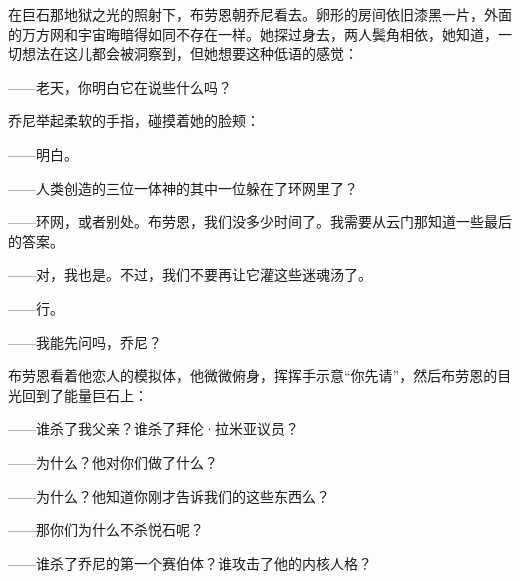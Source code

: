 \documentclass[AutoFakeBold=true]{book}
\begin{document}
\vspace*{1em}

在巨石那地狱之光的照射下，布劳恩朝乔尼看去。卵形的房间依旧漆黑一片，外面的万方网和宇宙晦暗得如同不存在一样。她探过身去，两人鬓角相依，她知道，一切想法在这儿都会被洞察到，但她想要这种低语的感觉：

{\kaishu ——老天，你明白它在说些什么吗？}

乔尼举起柔软的手指，碰摸着她的脸颊：

{\kaishu ——明白。}

{\kaishu ——人类创造的三位一体神的其中一位躲在了环网里了？}

{\kaishu ——环网，或者别处。布劳恩，我们没多少时间了。我需要从云门那知道一些最后的答案。}

{\kaishu ——对，我也是。不过，我们不要再让它灌这些迷魂汤了。}

{\kaishu ——行。}

{\kaishu ——我能先问吗，乔尼？}

布劳恩看着他恋人的模拟体，他微微俯身，挥挥手示意``你先请''，然后布劳恩的目光回到了能量巨石上：

{\kaishu ——谁杀了我父亲？谁杀了拜伦·拉米亚议员？}

{}

{\kaishu ——为什么？他对你们做了什么？}

{}

{\kaishu ——为什么？他知道你刚才告诉我们的这些东西么？}

{}

{\kaishu ——那你们为什么不杀悦石呢？}

{}

{\kaishu ——谁杀了乔尼的第一个赛伯体？谁攻击了他的内核人格？}

{}
\end{document}
